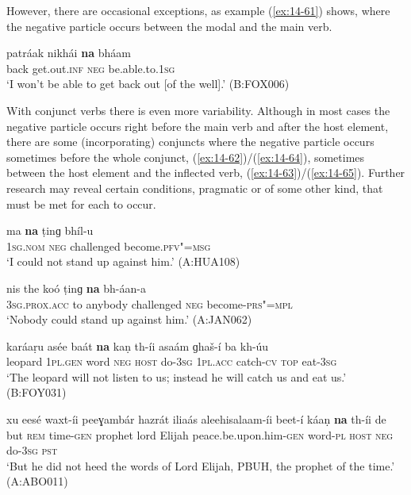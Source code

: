 However, there are occasional exceptions, as example (\ref{ex:14-61}) shows, where the negative particle occurs between the modal and the main verb.

\begin{exe}
\ex
\label{ex:14-61}
\gll patráak nikhái \textbf{na} bháam \\
back get.out.\textsc{inf} \textsc{neg} be.able.to.\textsc{1sg} \\
\glt `I won't be able to get back out [of the well].' (B:FOX006)
\end{exe}

With conjunct verbs there is even more variability. Although in most cases the negative particle occurs right before the main verb and after the host element, there are some (incorporating) conjuncts where the negative particle occurs sometimes before the whole conjunct, (\ref{ex:14-62})/(\ref{ex:14-64}), sometimes between the host element and the inflected verb, (\ref{ex:14-63})/(\ref{ex:14-65}). Further research may reveal certain conditions, pragmatic or of some other kind, that must be met for each to occur. 

\begin{exe}
\ex
\label{ex:14-62}
\gll ma \textbf{na} ṭinɡ bhíl-u \\
\textsc{1sg.nom} \textsc{neg} challenged become.\textsc{pfv"=msg } \\
\glt `I could not stand up against him.' (A:HUA108)

\ex
\label{ex:14-63}
\gll nis the koó ṭinɡ \textbf{na} bh-áan-a \\
\textsc{3sg.prox.acc} to anybody challenged \textsc{neg} become-\textsc{prs"=mpl } \\
\glt `Nobody could stand up against him.' (A:JAN062)

\ex
\label{ex:14-64}
\gll karáaṛu asée baát \textbf{na} kaṇ th-íi asaám ɡhaš-í ba kh-úu \\
leopard \textsc{1pl.gen} word \textsc{neg} \textsc{host} do-\textsc{3sg} \textsc{1pl.acc} catch-\textsc{cv}  \textsc{top} eat-\textsc{3sg} \\
\glt `The leopard will not listen to us; instead he will catch us and eat us.' (B:FOY031)

\ex
\label{ex:14-65}
\gll xu eesé waxt-íi peeɣambár hazrát iliaás aleehisalaam-íi beet-í káaṇ \textbf{na} th-íi de \\
but \textsc{rem} time-\textsc{gen} prophet lord  Elijah peace.be.upon.him-\textsc{gen} word-\textsc{pl} \textsc{host} \textsc{neg} do-\textsc{3sg} \textsc{pst} \\
\glt `But he did not heed the words of Lord Elijah, PBUH, the prophet of the time.' (A:ABO011)
\end{exe}

